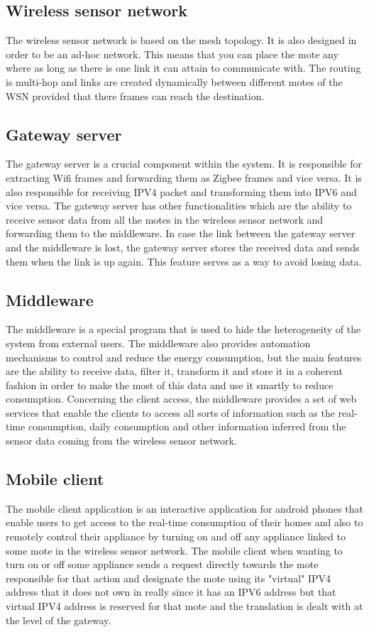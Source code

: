 \documentclass[conference]{IEEEtran}
\begin{document}
\subsection{Wireless sensor network}
The wireless sensor network is based on the mesh topology. It is also designed in order to be an ad-hoc network. This means that you can place the mote any where as long as there is one link it can attain to communicate with. The routing is multi-hop and links are created dynamically between different motes of the WSN provided that there frames can reach the destination. 

\subsection{Gateway server}
The gateway server is a crucial component within the system. It is responsible for extracting Wifi frames and forwarding them as Zigbee frames and vice versa. It is also responsible for receiving IPV4 packet and transforming them into IPV6 and vice versa. The gateway server has other functionalities which are the ability to receive sensor data from all the motes in the wireless sensor network and forwarding them to the middleware. In case the link between the gateway server and the middleware is lost, the gateway server stores the received data and sends them when the link is up again. This feature serves as a way to avoid losing data.

\subsection{Middleware}
The middleware is a special program that is used to hide the heterogeneity of the system from external users. The middleware also provides automation mechanisms to control and reduce the energy consumption, but the main features are the ability to receive data, filter it, transform it and store it in a coherent fashion in order to make the most of this data and use it smartly to reduce consumption. Concerning the client access, the middleware provides a set of web services that enable the clients to access all sorts of information such as the real-time consumption, daily consumption and other information inferred from the sensor data coming from the wireless sensor network.

\subsection{Mobile client}
The mobile client application is an interactive application for android phones that enable users to get access to the real-time consumption of their homes and also to remotely control their appliance by turning on and off any appliance linked to some mote in the wireless sensor network. The mobile client when wanting to turn on or off some appliance sends a request directly towards the mote responsible for that action and designate the mote using its "virtual" IPV4 address that it does not own in really since it has an IPV6 address but that virtual IPV4 address is reserved for that mote and the translation is dealt with at the level of the gateway.
\end{document}

